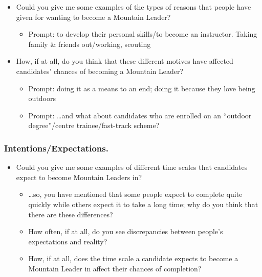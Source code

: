 \documentclass[
  12pt,
  a4paper,
]{book}
\providecommand{\tightlist}{%
  \setlength{\itemsep}{0pt}\setlength{\parskip}{0pt}}
\begin{document}
\begin{itemize}
\tightlist
\item
  Could you give me some examples of the types of reasons that people have given for wanting to become a Mountain Leader?

  \begin{itemize}
  \tightlist
  \item
    Prompt: to develop their personal skills/to become an instructor. Taking family \& friends out/working, scouting
  \end{itemize}
\item
  How, if at all, do you think that these different motives have affected candidates' chances of becoming a Mountain Leader?

  \begin{itemize}
  \tightlist
  \item
    Prompt: doing it as a means to an end; doing it because they love being outdoors
  \item
    Prompt: \ldots and what about candidates who are enrolled on an ``outdoor degree''/centre trainee/fast-track scheme?
  \end{itemize}
\end{itemize}

\hypertarget{intentionsexpectations.}{%
\subsubsection{Intentions/Expectations.}\label{intentionsexpectations.}}

\begin{itemize}
\tightlist
\item
  Could you give me some examples of different time scales that candidates expect to become Mountain Leaders in?

  \begin{itemize}
  \tightlist
  \item
    \ldots so, you have mentioned that some people expect to complete quite quickly while others expect it to take a long time; why do you think that there are these differences?
  \item
    How often, if at all, do you see discrepancies between people's expectations and reality?
  \item
    How, if at all, does the time scale a candidate expects to become a Mountain Leader in affect their chances of completion?
  \end{itemize}
\end{itemize}
\end{document}
